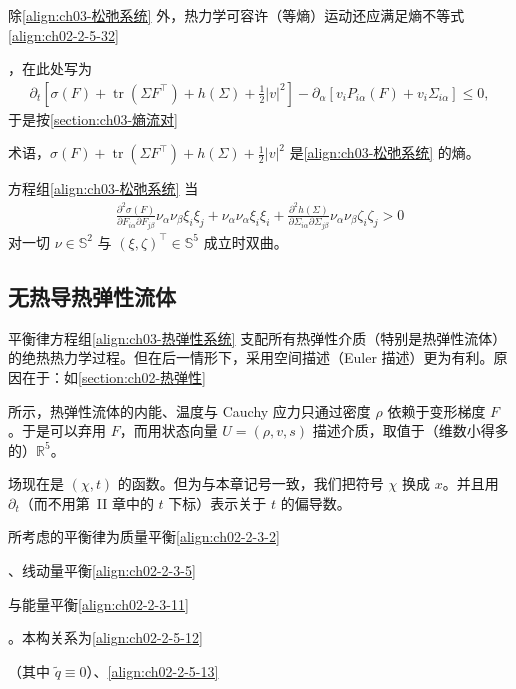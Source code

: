﻿\documentclass[../../main.tex]{subfiles}
\begin{document}
除\eqref{align:ch03-松弛系统} 外，热力学可容许（等熵）运动还应满足熵不等式\eqref{align:ch02-2-5-32}%

，在此处写为
\begin{align}
\partial_{t}\left[\sigma(F)+\operatorname{tr}(\Sigma F^{\top})+h(\Sigma)+\frac{1}{2}|v|^{2}\right]-\partial_{\alpha}\left[v_{i}P_{i\alpha}(F)+v_{i}\Sigma_{i\alpha}\right]\leqslant0,
\label{align:ch03-松弛熵不等式}
\end{align}
于是按\cref{section:ch03-熵流对}%

术语，$\sigma(F)+\operatorname{tr}(\Sigma F^{\top})+h(\Sigma)+\frac{1}{2}|v|^{2}$ 是\eqref{align:ch03-松弛系统} 的熵。

方程组\eqref{align:ch03-松弛系统} 当
\begin{align}
\frac{\partial^{2}\sigma(F)}{\partial F_{i\alpha}\partial F_{j\beta}}\nu_{\alpha}\nu_{\beta}\xi_{i}\xi_{j}+\nu_{\alpha}\nu_{\alpha}\xi_{i}\xi_{i}+\frac{\partial^{2}h(\Sigma)}{\partial\Sigma_{i\alpha}\partial\Sigma_{j\beta}}\nu_{\alpha}\nu_{\beta}\zeta_{i}\zeta_{j}>0
\label{align:ch03-松弛双曲条件}
\end{align}
对一切 $\nu\in\mathbb{S}^{2}$ 与 $(\xi,\zeta)^{\top}\in\mathbb{S}^{5}$ 成立时双曲。

\subsection{无热导热弹性流体}\label{subsection:ch03-热弹性流体}

平衡律方程组\eqref{align:ch03-热弹性系统} 支配所有热弹性介质（特别是热弹性流体）的绝热热力学过程。但在后一情形下，采用空间描述（Euler 描述）更为有利。原因在于：如\cref{section:ch02-热弹性}%

所示，热弹性流体的内能、温度与 Cauchy 应力只通过密度 $\rho$ 依赖于变形梯度 $F$。于是可以弃用 $F$，而用状态向量 $U=(\rho,v,s)$ 描述介质，取值于（维数小得多的）$\mathbb{R}^{5}$。

场现在是 $(\chi,t)$ 的函数。但为与本章记号一致，我们把符号 $\chi$ 换成 $x$。并且用 $\partial_{t}$（而不用第~II 章中的 $t$ 下标）表示关于 $t$ 的偏导数。

所考虑的平衡律为质量平衡\eqref{align:ch02-2-3-2}%

、线动量平衡\eqref{align:ch02-2-3-5}%

与能量平衡\eqref{align:ch02-2-3-11}%

。本构关系为\eqref{align:ch02-2-5-12}%

（其中 $\tilde{q}\equiv0$）、\eqref{align:ch02-2-5-13}%
\end{document}

